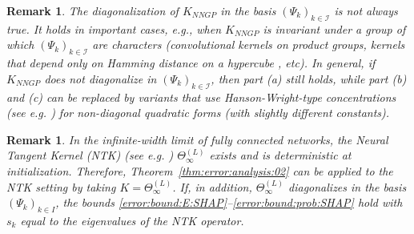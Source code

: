 \documentclass[letterpaper,11pt]{article}
\numberwithin{equation}{section}
\newtheorem{remark}[theorem]{Remark}
\numberwithin{equation}{section}
\begin{document}
\begin{remark}
    The diagonalization of $K_{NNGP}$ in the basis $(\Psi_k)_{k\in \mathcal{I}}$ is not always true. It holds in important cases, e.g., when $K_{NNGP}$ is invariant under a group of which $(\Psi_k)_{k\in \mathcal{I}}$ are characters (convolutional kernels on product groups, kernels that depend only on Hamming distance on a hypercube \cite{hamming1950error}, etc). In general, if $K_{NNGP}$ does not diagonalize in $(\Psi_k)_{k\in \mathcal{I}}$, then part (a) still holds, while part (b) and (c) can be replaced by variants that use Hanson-Wright-type concentrations (see e.g. \cite{vershynin2018high}) for non-diagonal quadratic forms (with slightly different constants).
\end{remark}

\begin{remark}

In the infinite-width limit of fully connected networks, the Neural Tangent Kernel (NTK) (see e.g. \cite{jacot2018neural}) $\Theta^{(L)}_\infty$ exists and is deterministic at initialization. Therefore, Theorem~\ref{thm:error:analysis:02} can be applied to the NTK setting by taking $K=\Theta^{(L)}_\infty$. If, in addition, $\Theta^{(L)}_\infty$ diagonalizes in the basis $(\Psi_k)_{k\in I}$, the bounds \eqref{error:bound:E:SHAP}–\eqref{error:bound:prob:SHAP} hold with $s_k$ equal to the eigenvalues of the NTK operator. %


\end{remark}



\end{document}
